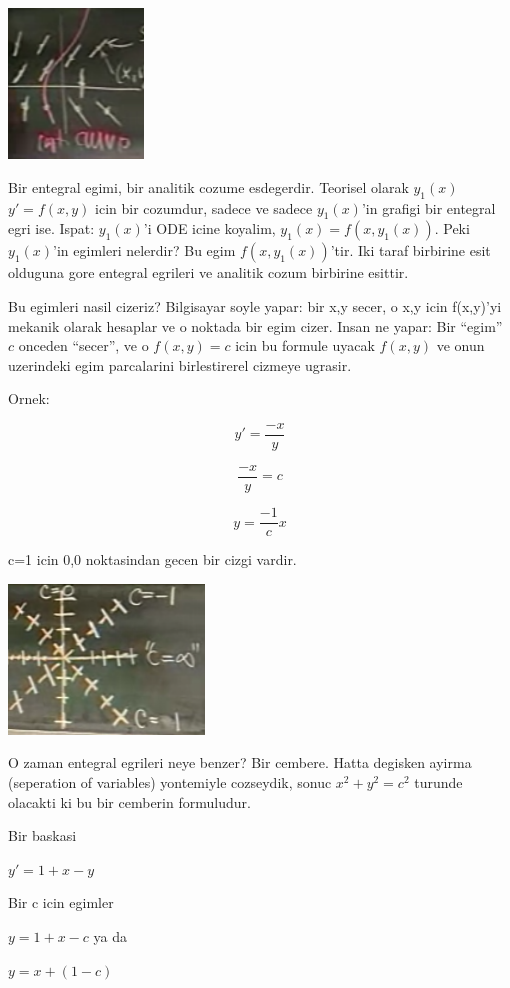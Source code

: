\documentclass[12pt,fleqn]{article}
\begin{document}
\includegraphics[height=4cm]{./1_2.png}

Bir entegral egimi, bir analitik cozume esdegerdir. Teorisel olarak $y_1(x)$
$y'=f(x,y)$ icin bir cozumdur, sadece ve sadece $y_1(x)$'in grafigi bir entegral
egri ise. Ispat: $y_1(x)$'i ODE icine koyalim, $y_1(x) = f(x,y_1(x))$. Peki
$y_1(x)$'in egimleri nelerdir? Bu egim $f(x,y_1(x))$'tir. Iki taraf birbirine
esit olduguna gore entegral egrileri ve analitik cozum birbirine esittir.

Bu egimleri nasil cizeriz? Bilgisayar soyle yapar: bir x,y secer, o x,y icin
f(x,y)'yi mekanik olarak hesaplar ve o noktada bir egim cizer. Insan ne yapar:
Bir ``egim'' $c$ onceden ``secer'', ve o $f(x,y)=c$ icin bu formule uyacak
$f(x,y)$ ve onun uzerindeki egim parcalarini birlestirerel cizmeye ugrasir.

Ornek: 

\[ y' = \frac{-x}{y} \]

\[ \frac{-x}{y} = c \]

\[ y = \frac{-1}{c}x \]

c=1 icin 0,0 noktasindan gecen bir cizgi vardir.

\includegraphics[height=4cm]{./1_3.png}

O zaman entegral egrileri neye benzer? Bir cembere. Hatta degisken ayirma
(seperation of variables) yontemiyle cozseydik, sonuc $x^2+y^2=c^2$ turunde
olacakti ki bu bir cemberin formuludur.

Bir baskasi

$y' = 1+x-y$

Bir c icin egimler

$y = 1+x-c$ ya da

$y = x+(1-c)$
\end{document}
